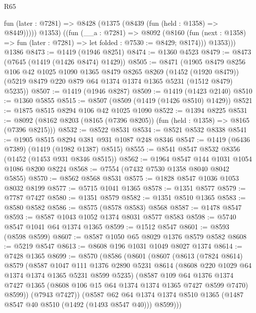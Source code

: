\begin{lexlean}{R65}
\begin{coremodule}
          fun (later : @7281) => @8428 (@1375 (@8439 (fun (held : @1358) => @8449)))))
          @1353)
        ((fun (__a : @7281) =>
        @8092
          (@8160 (fun (next : @1358) => fun (later : @7281) => let folded : @7530 := @8429; @8174)))
          @1353)))
    @1386
@8473 := @1419 (@1946 @8251)
@8474 := @1360 @4523
@8479 := @8473 (@7645 (@1419 (@1426 @8474) @1429))
@8505 := @8471
    (@1905
      @8479
      @8256
      @106
      @42
      @1025
      @1090
      @1365
      @8479
      @8265
      @8269
      (@1452 (@1920 @8479))
      (@5219 @8479 @220 @879 @64 @1374 @1374 @1365 @5231 (@1512 @8479) @5235))
@8507 := @1419 (@1946 @8287)
@8509 := @1419 (@1423 @2140)
@8510 := @1360 @5855
@8515 := @8507 (@8509 (@1419 (@1426 @8510) @1429))
@8521 := @1875 @8515 @8294 @106 @42 @1025 @1090
@8522 := @1394 @8225
@8531 := @8092 (@8162 @8203 (@8165 (@7396 @8205)) (fun (held : @1358) => @8165 (@7396 @8215)))
@8532 := @8522 @8531
@8534 := @8521 @8532 @8338
@8541 := @1905 @8515 @8294 @381 @931 @1087 @248 @8346
@8547 := @1419 (@6436 @7389) (@1419 (@1982 @1387) @8515)
@8555 := @8541 @8547 @8532 @8356 (@1452 (@1453 @931 @8346 @8515))
@8562 := @1964 @8547 @144 @1031 @1054 @1086 @8200 @8224
@8568 := @7554 (@7432 @7530 @1358 @8040 @8042 @5855)
@8570 := @8562 @8568 @8531
@8575 := @1828 @8547 @1036 @1053 @8032 @8199
@8577 := @5715 @1041 @1365
@8578 := @1351 @8577
@8579 := @7787 @7427
@8580 := @1351 @8579
@8582 := @1351 @8510 @1365
@8583 := @8580 @8582
@8586 := @8575 (@8578 @8583) @8568
@8587 := @1478 @8547
@8593 := @8587 @1043 @1052 @1374 @8031 @8577 @8583
@8598 := @5740 @8547 @1041 @64 @1374 @1365
@8599 := @1512 @8547
@8601 := @8593 (@8598 @8599)
@8607 := @8587 @1050 @65 @8029 @1376 @8579 @8582
@8608 := @5219 @8547
@8613 := @8608 @196 @1031 @1049 @8027 @1374
@8614 := @7428 @1365
@8699 := @8570
    (@8586
      (@8601
        (@8607
          (@8613
            (@7824 @8614)
            @8579
            (@8587
              @1047
              @111
              @1376
              @2890
              @5231
              @8614
              (@8608 @220 @1029 @64 @1374 @1374 @1365 @5231 @8599 @5235)
              (@8587
                @109
                @64
                @1376
                @1374
                @7427
                @1365
                (@8608 @106 @15 @64 @1374 @1374 @1365 @7427 @8599 @7470)
                @8599))
            (@7943 @7427))
          (@8587
            @62
            @64
            @1374
            @1374
            @8510
            @1365
            (@1487 @8547 @40 @8510 (@1492 (@1493 @8547 @40)))
            @8599)))

\end{coremodule}
\end{lexlean}
